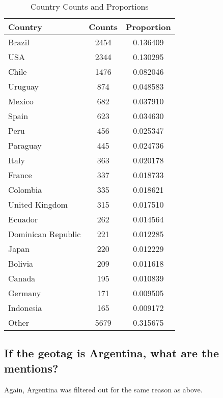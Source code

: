 \begin{table}[H]
\centering
\begin{tabular}{lcc}
\hline
Country & Counts & Proportion \\
\hline
Brazil & 2454 & 0.136409 \\
USA & 2344 & 0.130295 \\
Chile & 1476 & 0.082046 \\
Uruguay & 874 & 0.048583 \\
Mexico & 682 & 0.037910 \\
Spain & 623 & 0.034630 \\
Peru & 456 & 0.025347 \\
Paraguay & 445 & 0.024736 \\
Italy & 363 & 0.020178 \\
France & 337 & 0.018733 \\
Colombia & 335 & 0.018621 \\
United Kingdom & 315 & 0.017510 \\
Ecuador & 262 & 0.014564 \\
Dominican Republic & 221 & 0.012285 \\
Japan & 220 & 0.012229 \\
Bolivia & 209 & 0.011618 \\
Canada & 195 & 0.010839 \\
Germany & 171 & 0.009505 \\
Indonesia & 165 & 0.009172 \\
Other & 5679 & 0.315675 \\
\hline
\end{tabular}
\caption{Country Counts and Proportions}
\label{tab:distances-argentina-mentioned}
\end{table}


\subsection{If the geotag is Argentina, what are the mentions?}

Again, Argentina was filtered out for the same reason as above.

